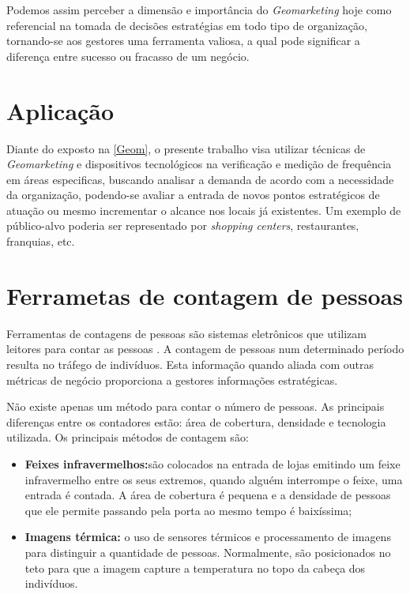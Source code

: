 Podemos assim perceber a dimensão e importância do \emph{Geomarketing} hoje como referencial na tomada de decisões estratégias em todo tipo de organização, tornando-se aos gestores uma ferramenta valiosa,  a qual pode significar a diferença entre sucesso ou fracasso de um negócio. 

\section{Aplicação}
Diante do exposto na \autoref{Geom}, o presente trabalho visa utilizar técnicas de \emph{Geomarketing} e dispositivos tecnológicos na verificação e medição de frequência em áreas especificas, buscando analisar a demanda de acordo com a necessidade da organização, podendo-se avaliar a entrada de novos pontos estratégicos de atuação ou mesmo incrementar o alcance nos locais já existentes. Um exemplo de público-alvo poderia ser representado por \emph{shopping centers}, restaurantes, franquias, etc.  

\section{Ferrametas de contagem de pessoas}
Ferramentas de contagens de pessoas são sistemas eletrônicos que utilizam leitores para contar as pessoas \cite{trafsysdef}. A contagem de pessoas
num determinado período resulta no tráfego de indivíduos. Esta informação quando aliada com outras métricas de negócio proporciona a gestores
informações estratégicas.

Não existe apenas um método para contar o número de pessoas. As principais diferenças entre os contadores estão: área de cobertura, densidade e tecnologia utilizada. Os principais
métodos de contagem são:
\begin{itemize}
  \item \textbf{Feixes infravermelhos:}são colocados na entrada de lojas emitindo um feixe infravermelho entre os seus extremos, quando
  alguém interrompe o feixe, uma entrada é contada. A área de cobertura é pequena e a densidade de pessoas que ele permite passando pela porta
  ao mesmo tempo é baixíssima;
  \item \textbf{Imagens térmica:} o uso de sensores térmicos e processamento de imagens para distinguir a quantidade de pessoas. Normalmente, são
  posicionados no teto para que a imagem capture a temperatura no topo da cabeça dos indivíduos.
\end{itemize}




